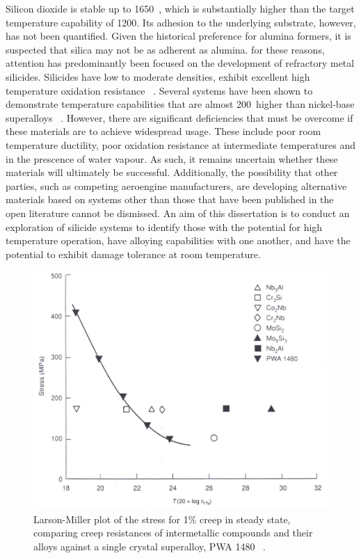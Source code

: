 Silicon dioxide is stable up to 1650\celsius ~\cite{hallstedt92}, which is substantially higher than the target temperature capability of 1200\celsius .  Its adhesion to the underlying substrate, however, has not been quantified.  Given the historical preference for alumina formers, it is suspected that silica may not be as adherent as alumina.  for these reasons, attention has predominantly been focused on the development of refractory metal silicides. Silicides have low to moderate densities, exhibit excellent high temperature oxidation resistance ~\cite{brady00}.  Several systems have been shown to demonstrate temperature capabilities that are almost 200\celsius\ higher than nickel-base superalloys ~\cite{schneibel03, sadananda99}.  However, there are significant deficiencies that must be overcome if these materials are to achieve widespread usage. These include poor room temperature ductility, poor oxidation resistance at intermediate temperatures and in the prescence of water vapour. As such, it remains uncertain whether these materials will ultimately be successful. Additionally, the possibility that other parties, such as competing aeroengine manufacturers, are developing alternative materials based on systems other than those that have been published in the open literature cannot be dismissed. An aim of this dissertation is to conduct an exploration of silicide systems to identify those with the potential for high temperature operation, have alloying capabilities with one another, and have the potential to exhibit damage tolerance at room temperature.
%
\begin{figure}[H]
\begin{center}
\includegraphics[width=13cm]{LMplotforintermetallics}
\caption{Larson-Miller plot of the stress for 1\% creep in steady state, comparing creep resistances of intermetallic compounds and their alloys against a single crystal superalloy, PWA 1480 ~\cite{anton89, anton89b, shah95}.}
\label{fig:LMplotforintermetallics}
\end{center}
\end{figure}
%

